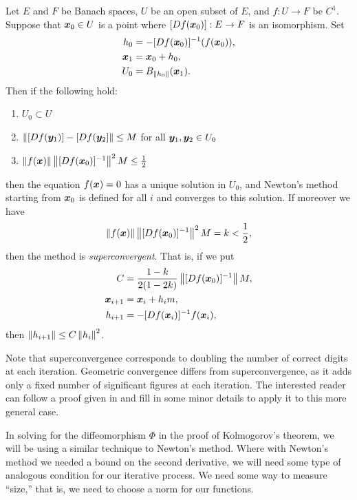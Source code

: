 \documentclass[twoside,letterpaper,11pt]{article}
\numberwithin{equation}{section}
\begin{document}
\begin{thm}[Kantorovitch]
  Let $E$ and $F$ be Banach spaces, $U$ be an open subset of $E$, and $f : U \to
  F$ be $C^1$.
  Suppose that $\bm{x}_0 \in U$ is a point where $[\mathop{}\!D f(\bm{x}_0)] : E \to F$
  is an isomorphism.
  Set
  \begin{align*}
    h_0 &= -[\Dif f(\bp{x}_0)]^{-1}(f(\bp{x}_0)),\\
    \bp{x}_1 &= \bp{x}_0 + h_0,\\
    U_0 &= B_{\norm{h_0}}(\bp{x}_1).
  \end{align*}
  Then if the following hold:
  \begin{enumerate}
  \item $U_0 \subset U$
  \item $\norm{[\Dif f(\bp{y}_1)] - [\Dif f(\bp{y}_2]} \leq M$ for all
    $\bm{y}_1, \bm{y}_2 \in U_0$
  \item $\norm{f(\bp{x})} \norm{[\Dif f(\bp{x}_0)]^{-1}}^2 M \leq \frac{1}{2}$
  \end{enumerate}
  then the equation $f(\bm{x}) = 0$ has a unique solution in $U_0$, and Newton's
  method starting from $\bm{x}_0$ is defined for all $i$ and converges to this
  solution.
  If moreover we have
  \begin{equation*}
    \norm{f(\bp{x})} \norm{[\Dif f(\bp{x}_0)]^{-1}}^2 M = k < \frac{1}{2},
  \end{equation*}
  then the method is \emph{superconvergent}.
  That is, if we put
  \begin{align*}
    C &= \frac{1 - k}{2(1 - 2k)}\norm{[\Dif f(\bp{x}_0)]^{-1}} M,\\
    \bp{x}_{i+1} &= \bp{x}_i + h_im,\\
    h_{i+1} &= -[\Dif f(\bp{x}_i)]^{-1} f(\bp{x}_i),
  \end{align*}
  then $\norm{h_{i+1}} \leq C \norm{h_i}^2$.
\end{thm}
Note that superconvergence corresponds to doubling the number of correct digits
at each iteration.
Geometric convergence differs from superconvergence, as it adds only a fixed
number of significant figures at each iteration.
The interested reader can follow a proof given in \cite{hh09} and fill in some
minor details to apply it to this more general case.

In solving for the diffeomorphism $\Phi$ in the proof of Kolmogorov's theorem,
we will be using a similar technique to Newton's method.
Where with Newton's method we needed a bound on the second derivative, we will
need some type of analogous condition for our iterative process.
We need some way to measure ``size,'' that is, we need to choose a norm for our
functions.
\end{document}
